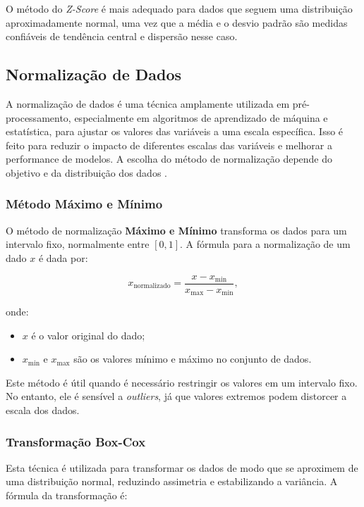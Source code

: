 O método do \textit{Z-Score} é mais adequado para dados que seguem uma distribuição aproximadamente normal, uma vez que a média e o desvio padrão são medidas confiáveis de tendência central e dispersão nesse caso.


\subsection{Normalização de Dados}
\label{subsec:normalization}

A normalização de dados é uma técnica amplamente utilizada em pré-processamento, especialmente em algoritmos de aprendizado de máquina e estatística, para ajustar os valores das variáveis a uma escala específica. Isso é feito para reduzir o impacto de diferentes escalas das variáveis e melhorar a performance de modelos. A escolha do método de normalização depende do objetivo e da distribuição dos dados \cite{Dekking2005}.

\subsubsection{Método Máximo e Mínimo}

O método de normalização \textbf{Máximo e Mínimo} transforma os dados para um intervalo fixo, normalmente entre \( [0, 1] \). A fórmula para a normalização de um dado \( x \) é dada por:

\[
x_{\text{normalizado}} = \frac{x - x_{\text{min}}}{x_{\text{max}} - x_{\text{min}}},
\]

\noindent
onde:
\begin{itemize}
    \item \( x \) é o valor original do dado;
    \item \( x_{\text{min}} \) e \( x_{\text{max}} \) são os valores mínimo e máximo no conjunto de dados.
\end{itemize}

Este método é útil quando é necessário restringir os valores em um intervalo fixo. No entanto, ele é sensível a \textit{outliers}, já que valores extremos podem distorcer a escala dos dados.

\subsubsection{Transformação Box-Cox}

Esta técnica é utilizada para transformar os dados de modo que se aproximem de uma distribuição normal, reduzindo assimetria e estabilizando a variância. A fórmula da transformação é:

